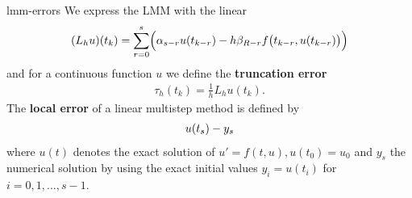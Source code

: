 \begin{Definition}{lmm-errors}
  We express the LMM with the linear 
  \begin{gather}
    \label{eq:lmm:9}
    (L_hu)(t_k) = \sum_{r=0}^{s}\Bigl(\alpha_{s-r} u(t_{k-r}) - h
    \beta_{R-r} f\bigl(t_{k-r},u(t_{k-r})\bigr)\Bigr)
  \end{gather}
  and for a continuous function $u$ we define the \textbf{truncation
    error}
  \begin{gather}
    \label{eq:lmm:10}
    \tau_h(t_k) = \tfrac1hL_hu(t_k).
  \end{gather}
  The \textbf{local error}  of a linear multistep method is defined by
  \begin{gather*}
    u(t_s) - y_s
  \end{gather*}
  where $u(t)$ denotes the exact solution of $u' = f(t,u), u(t_0)=u_0$
  and $y_s$ the numerical solution by using the exact initial values
 	$y_i = u(t_i)$ for $i = 0,1,...,s-1$.
\end{Definition}

